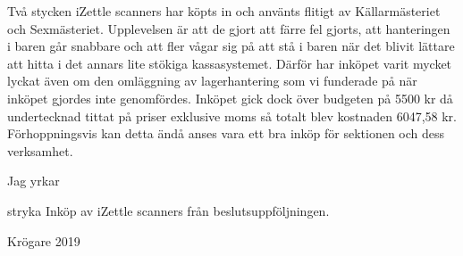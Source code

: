 \documentclass[../_main/handlingar.tex]{subfiles}
\begin{document}

    Två stycken iZettle scanners har köpts in och använts flitigt av Källarmästeriet och Sexmästeriet. Upplevelsen är att de gjort att färre fel gjorts, att hanteringen i baren går snabbare och att fler vågar sig på att stå i baren när det blivit lättare att hitta i det annars lite stökiga kassasystemet. Därför har inköpet varit mycket lyckat även om den omläggning av lagerhantering som vi funderade på när inköpet gjordes inte genomfördes. Inköpet gick dock över budgeten på 5500 kr då undertecknad tittat på priser exklusive moms så totalt blev kostnaden 6047,58 kr. Förhoppningsvis kan detta ändå anses vara ett bra inköp för sektionen och dess verksamhet. 

    Jag yrkar 

\begin{attsatser}
    \att stryka Inköp av iZettle scanners från beslutsuppföljningen.
\end{attsatser}

\begin{signatures}{1}
    \signature{Davida Åström}{Krögare 2019}
\end{signatures}
\end{document}
